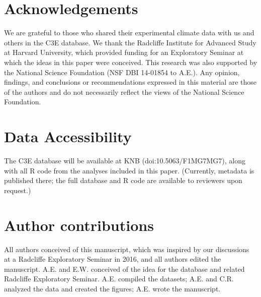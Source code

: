 \documentclass{article}
\begin{document}
 \section* {Acknowledgements}
We are grateful to those who shared their experimental climate data with us and others in the C3E database. We thank the Radcliffe Institute for Advanced Study at Harvard University, which provided funding for an Exploratory Seminar at which the ideas in this paper were conceived. This research was also supported by the National Science Foundation (NSF DBI 14-01854 to A.E.). Any opinion, findings, and conclusions or recommendations expressed in this material are those of the authors and do not necessarily reflect the views of the National Science Foundation.
\section*{Data Accessibility}
The C3E database will be available at KNB (doi:10.5063/F1MG7MG7), along with all R code from the analyses included in this paper. (Currently, metadata is published there; the full database and R code are available to reviewers upon request.)

\section*{Author contributions} All authors conceived of this manuscript, which was inspired by our discussions at a Radcliffe Exploratory Seminar in 2016, and all authors edited the manuscript. A.E. and E.W. conceived of the idea for the database and related Radcliffe Exploratory Seminar. A.E. compiled the datasets; A.E. and C.R. analyzed the data and created the figures; A.E. wrote the manuscript.
\end{document}
